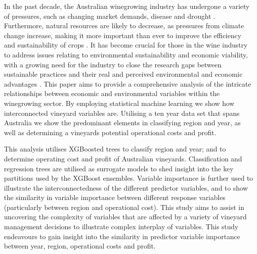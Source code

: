 \documentclass[review,12pt,authoryear]{elsarticle}
\begin{document}
\begin{linenumbers}
In the past decade, the Australian winegrowing industry has undergone a variety of pressures, such as changing market demands, disease and drought \citep{wineaustraliaAustralianWineProduction2021}. Furthermore, natural resources are likely to decrease, as pressures from climate change increase, making it more important than ever to improve the efficiency and sustainability of crops \citep{agdeeNationalGreenhouseAccounts2021}. It has become crucial for those in the wine industry to address issues relating to environmental sustainability and economic viability, with a growing need for the industry to close the research gaps between sustainable practices and their real and perceived environmental and economic advantages \citep{montalvo-falconSustainabilityResearchWine2023,ouvrardDoesSustainabilityPush2020}. This paper aims to provide a comprehensive analysis of the intricate relationships between economic and environmental variables within the winegrowing sector. By employing statistical machine learning we show how interconnected vineyard variables are. Utilising a ten year data set that spans Australia we show the predominant 
elements in classifying region and year, %
 as well as determining a vineyards potential operational costs and profit.
\par
This analysis utilises 
XGBoosted trees %
 to classify region and year; and to determine operating cost and profit of Australian vineyards. Classification and regression trees are 
 utilised as surrogate models %
to shed insight into the key partitions used by the XGBoost ensembles. Variable importance is further used to illustrate the 
interconnectedness %
of the different predictor variables, and to show the similarity in
variable importance %
between different response variables (particularly between region and operational cost). This study aims to assist in uncovering 
the complexity of variables %
that are affected by a variety of vineyard management decisions to illustrate 
complex interplay of variables. %
This study endeavours to gain insight into the 
similarity %
 in predictor variable importance between year, region, operational costs and profit.


\end{linenumbers}
\end{document}
